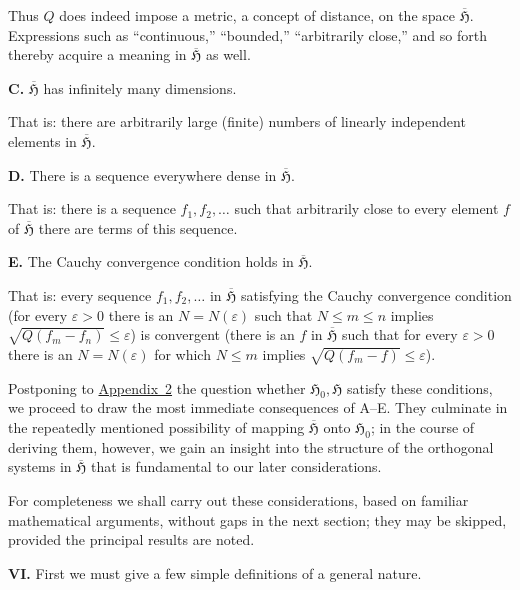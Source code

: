 \documentclass[fontsize=13pt,paper=b5,twoside,bookmarkpackage=false]{scrartcl}
\newcommand{\articleSection}[1]{%
  \par\addvspace{\medskipamount}\phantomsection\label{sec:#1}%
  \pdfbookmark[1]{Section #1}{section-#1}%
  \noindent\textbf{#1.}\enspace\ignorespaces}
\newcommand{\App}[1]{\hyperref[app:#1]{Appendix~#1}}
\begin{document}
Thus $Q$ does indeed impose a metric, a concept of distance, on the space $\overline{\mathfrak{H}}$. Expressions such as ``continuous,'' ``bounded,'' ``arbitrarily close,'' and so forth thereby acquire a meaning in $\overline{\mathfrak{H}}$ as well.

\par\medskip\noindent\textbf{C.}\label{axiom:C}
$\overline{\mathfrak{H}}$ has infinitely many dimensions.

That is: there are arbitrarily large (finite) numbers of linearly independent elements in $\overline{\mathfrak{H}}$.

\par\medskip\noindent\textbf{D.}\label{axiom:D}
There is a sequence everywhere dense in $\overline{\mathfrak{H}}$.

That is: there is a sequence $f_1,f_2,\ldots$ such that arbitrarily close to every element $f$ of $\overline{\mathfrak{H}}$ there are terms of this sequence.

\par\medskip\noindent\textbf{E.}\label{axiom:E}
The Cauchy convergence condition holds in $\overline{\mathfrak{H}}$.

That is: every sequence $f_1,f_2,\ldots$ in $\overline{\mathfrak{H}}$ satisfying the Cauchy convergence condition (for every $\varepsilon>0$ there is an $N=N(\varepsilon)$ such that $N\le m\le n$ implies $\sqrt{Q(f_m-f_n)}\le\varepsilon$) is convergent (there is an $f$ in $\overline{\mathfrak{H}}$ such that for every $\varepsilon>0$ there is an $N=N(\varepsilon)$ for which $N\le m$ implies $\sqrt{Q(f_m-f)}\le\varepsilon$).

Postponing to \App{2} the question whether $\mathfrak{H}_0,\mathfrak{H}$ satisfy these conditions, we proceed to draw the most immediate consequences of A--E. They culminate in the repeatedly mentioned possibility of mapping $\overline{\mathfrak{H}}$ onto $\mathfrak{H}_0$; in the course of deriving them, however, we gain an insight into the structure of the orthogonal systems in $\overline{\mathfrak{H}}$ that is fundamental to our later considerations.

For completeness we shall carry out these considerations, based on familiar mathematical arguments, without gaps in the next section; they may be skipped, provided the principal results are noted.

\articleSection{VI}
First we must give a few simple definitions of a general nature.
\end{document}
